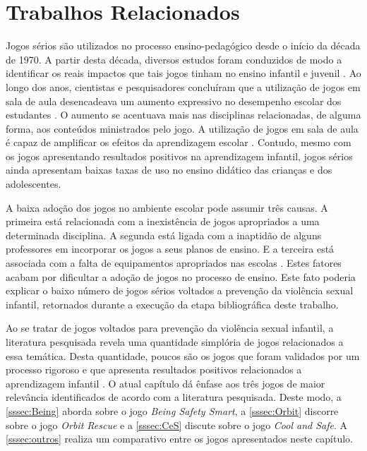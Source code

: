 



\chapter{Trabalhos Relacionados}\label{ssec:JS}

Jogos sérios são utilizados no processo ensino-pedagógico desde o início da década de 1970. A partir desta década, diversos estudos foram conduzidos de modo a identificar os reais impactos que tais jogos tinham no ensino infantil e juvenil \cite{stieler2016paper}. Ao longo dos anos, cientistas e pesquisadores concluíram que a utilização de jogos em sala de aula desencadeava um aumento expressivo no desempenho escolar dos estudantes \cite{wentzel1998social}. O aumento se acentuava mais nas disciplinas relacionadas, de alguma forma, aos conteúdos ministrados pelo jogo. A utilização de jogos em sala de aula é capaz de amplificar os efeitos da aprendizagem escolar \cite{jones2020serious}. Contudo, mesmo com os jogos apresentando resultados positivos na aprendizagem infantil, jogos sérios ainda apresentam baixas taxas de uso no ensino didático das crianças e dos adolescentes. 

A baixa adoção dos jogos no ambiente escolar pode assumir três causas. A primeira está relacionada com a inexistência de jogos apropriados a uma determinada disciplina. A segunda está ligada com a inaptidão de alguns professores em incorporar os jogos a seus planos de ensino. E a terceira está associada com a falta de equipamentos apropriados nas escolas \cite{dip2016advancing}. Estes fatores acabam por dificultar a adoção de jogos no processo de ensino. Este fato poderia explicar o baixo número de jogos sérios voltados a prevenção da violência sexual infantil, retornados durante a execução da etapa bibliográfica deste trabalho. 

Ao se tratar de jogos voltados para prevenção da violência sexual infantil, a literatura pesquisada revela uma quantidade simplória de jogos relacionados a essa temática. Desta quantidade, poucos são os jogos que foram validados por um processo rigoroso e que apresenta resultados positivos relacionados a aprendizagem infantil \cite{jones2010being}. O atual capítulo dá ênfase aos três jogos de maior relevância identificados de acordo com a literatura pesquisada. Deste modo, a \autoref{sssec:Being} aborda sobre o jogo \textit{Being Safety Smart}, a \autoref{sssec:Orbit} discorre sobre o jogo \textit{Orbit Rescue} e a \autoref{sssec:CeS} discute sobre o jogo \textit{Cool and Safe}. A \autoref{sssec:outros} realiza um comparativo entre os jogos apresentados neste capítulo.



